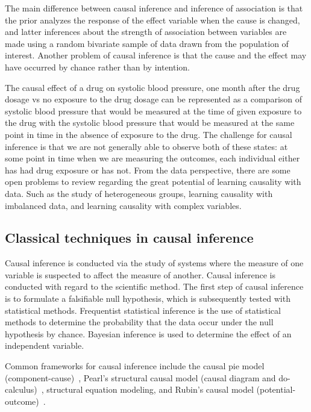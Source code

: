 \documentclass[
 aps,
 jmp,
 amsmath,amssymb,
 reprint,
]{revtex4-2}
\begin{document}
The main difference between causal inference and inference of association is that the prior analyzes the response of the effect variable when the cause is changed, and latter inferences about the strength of association between variables are made using a random bivariate sample of data drawn from the population of interest. 
Another problem of causal inference is that the cause and the effect may have occurred by chance rather than by intention.

The causal effect of a drug on systolic blood pressure, one month after the drug dosage vs no exposure to the drug dosage can be represented as a comparison of systolic blood pressure that would be measured at the time of given exposure to the drug with the systolic blood pressure that would be measured at the same point in time in the absence of exposure to the drug.
The challenge for causal inference is that we are not generally able to observe both of these states: at some point in time when we are measuring the outcomes, each individual either has had drug exposure or has not.
From the data perspective, there are some open problems to review regarding the great potential of learning causality with data. 
Such as the study of heterogeneous groups, learning causality with imbalanced data, and learning causality with complex variables. 

\subsection{Classical techniques in causal inference}


Causal inference is conducted via the study of systems where the measure of one variable is suspected to affect the measure of another. 
Causal inference is conducted with regard to the scientific method. 
The first step of causal inference is to formulate a falsifiable null hypothesis, which is subsequently tested with statistical methods.
Frequentist statistical inference is the use of statistical methods to determine the probability that the data occur under the null hypothesis by chance.
Bayesian inference is used to determine the effect of an independent variable.

Common frameworks for causal inference include the causal pie model (component-cause)~\cite{rothman2005causation}, Pearl's structural causal model (causal diagram and do-calculus)~\cite{pearl2000models}, structural equation modeling, and Rubin's causal model (potential-outcome)~\cite{imbens2015causal}.
\end{document}
